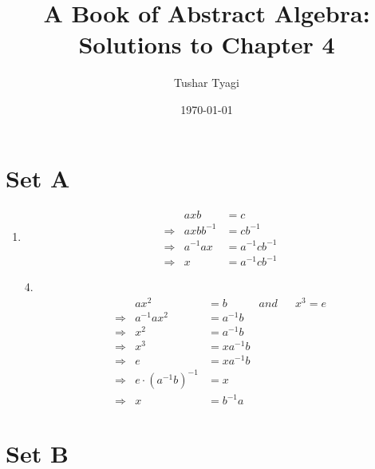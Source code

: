 \documentclass[12pt]{article}
\begin{document}
\title{A Book of Abstract Algebra: Solutions to Chapter 4}
\author{Tushar Tyagi}
\date{\today}
\maketitle

\section*{Set A}
\begin{enumerate}

\item 
\begin{align*}
&& axb &= c \\
& \Rightarrow & axbb^{-1} &= cb^{-1} \\
& \Rightarrow & a^{-1}ax  &= a^{-1}cb^{-1}\\
& \Rightarrow & x        &= a^{-1}cb^{-1}
\end{align*}

\item [4.]
\begin{align*}
&& ax^2 &= b & and && x^3 = e \\
& \Rightarrow & a^{-1}ax^2 &= a^{-1}b \\
& \Rightarrow & x^2 &= a^{-1}b \\
& \Rightarrow & x^3 &= xa^{-1}b \\
& \Rightarrow & e  &= xa^{-1}b \\
& \Rightarrow & e \cdot (a^{-1}b)^{-1} &= x \\
& \Rightarrow & x &= b^{-1}a
\end{align*}

\end{enumerate}




\section*{Set B}
\end{document}
